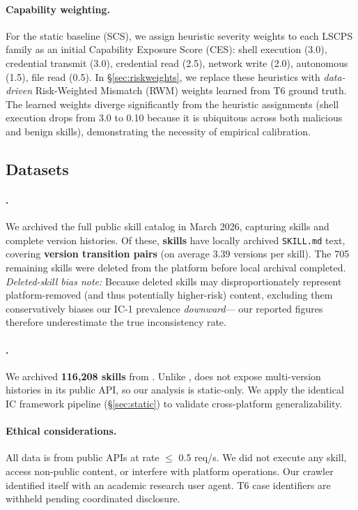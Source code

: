 \paragraph{Capability weighting.}
For the static baseline (SCS), we assign heuristic
severity weights to each LSCPS family as an initial
Capability Exposure Score (CES): shell execution (3.0),
credential transmit (3.0), credential read (2.5),
network write (2.0), autonomous (1.5), file read (0.5).
In \S\ref{sec:riskweights}, we replace these heuristics
with \emph{data-driven} Risk-Weighted Mismatch (RWM) weights
learned from T6 ground truth. The learned weights diverge
significantly from the heuristic assignments
(\eg shell execution drops from 3.0 to 0.10 because it is
ubiquitous across both malicious and benign skills),
demonstrating the necessity of empirical calibration.

\subsection{Datasets}

\paragraph{\clawhub{}.}
We archived the full \clawhub{} public skill catalog in March 2026,
capturing \NskillsCH{} skills and complete version histories.
Of these, \textbf{\NskillsDMR{} skills} have locally archived
\texttt{SKILL.md} text, covering \textbf{\Ntransitions{} version transition pairs}
(on average 3.39 versions per skill).
The 705 remaining skills were deleted from the platform before
local archival completed.
\textit{Deleted-skill bias note:} Because deleted skills may disproportionately
represent platform-removed (and thus potentially higher-risk) content,
excluding them conservatively biases our IC-1 prevalence \emph{downward}---
our reported figures therefore underestimate the true inconsistency rate.

\paragraph{\skillssh{}.}
We archived \textbf{116,208 skills} from \skillssh{}.
Unlike \clawhub{}, \skillssh{} does not expose
multi-version histories in its public API, so our analysis is static-only.
We apply the identical IC framework pipeline
(\S\ref{sec:static}) to validate cross-platform generalizability.

\paragraph{Ethical considerations.}
All data is from public APIs at rate $\leq$ 0.5 req/s.
We did not execute any skill, access non-public content,
or interfere with platform operations.
Our crawler identified itself with an academic research user agent.
T6 case identifiers are withheld pending coordinated disclosure.
